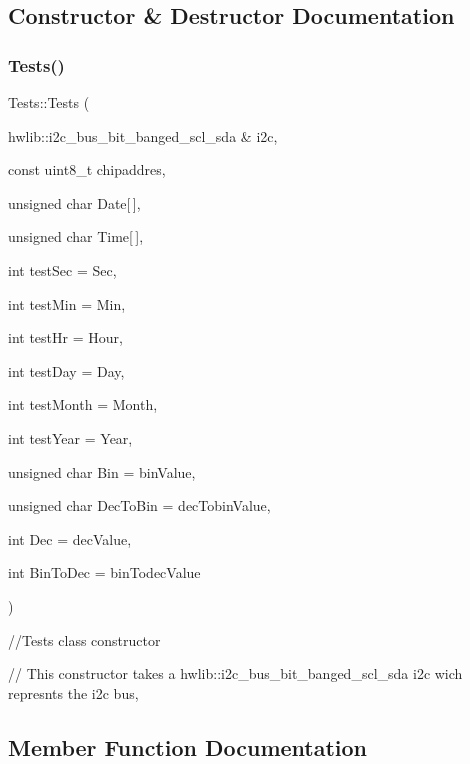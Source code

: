 \subsection{Constructor \& Destructor Documentation}
\mbox{\label{classTests_afc34127a38f4366f6a014ae65e10ee57}} 
\subsubsection{\texorpdfstring{Tests()}{Tests()}}
{\footnotesize\ttfamily Tests\+::\+Tests (\begin{DoxyParamCaption}\item[{hwlib\+::i2c\+\_\+bus\+\_\+bit\+\_\+banged\+\_\+scl\+\_\+sda \&}]{i2c,  }\item[{const uint8\+\_\+t}]{chipaddres,  }\item[{unsigned char}]{Date\mbox{[}$\,$\mbox{]},  }\item[{unsigned char}]{Time\mbox{[}$\,$\mbox{]},  }\item[{int}]{test\+Sec = {\ttfamily Sec},  }\item[{int}]{test\+Min = {\ttfamily Min},  }\item[{int}]{test\+Hr = {\ttfamily Hour},  }\item[{int}]{test\+Day = {\ttfamily Day},  }\item[{int}]{test\+Month = {\ttfamily Month},  }\item[{int}]{test\+Year = {\ttfamily Year},  }\item[{unsigned char}]{Bin = {\ttfamily binValue},  }\item[{unsigned char}]{Dec\+To\+Bin = {\ttfamily decTobinValue},  }\item[{int}]{Dec = {\ttfamily decValue},  }\item[{int}]{Bin\+To\+Dec = {\ttfamily binTodecValue} }\end{DoxyParamCaption})}



//\+Tests class constructor 

// This constructor takes a hwlib\+::i2c\+\_\+bus\+\_\+bit\+\_\+banged\+\_\+scl\+\_\+sda i2c wich represnts the i2c bus, 

\subsection{Member Function Documentation}
\mbox{\label{classTests_ae29be1edf96424ad0f81a15bbf5b983e}} 
